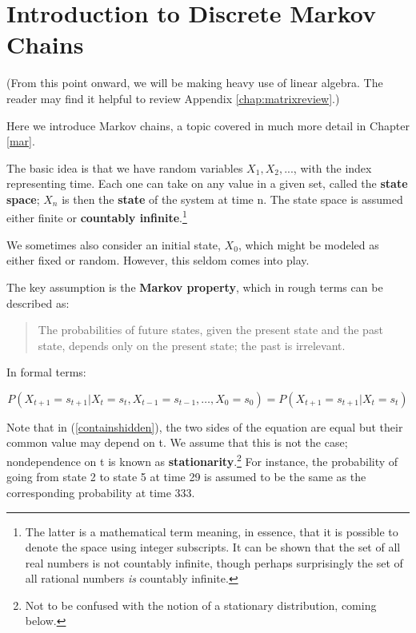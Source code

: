 \chapter{Introduction to Discrete Markov Chains}  
\label{dismarkov}

(From this point onward, we will be making heavy use of linear algebra.
The reader may find it helpful to review Appendix
\ref{chap:matrixreview}.)

Here we introduce Markov chains, a topic covered in much more detail in
Chapter \ref{mar}.  

The basic idea is that we have random variables $X_1, X_2, ...$, with
the index representing time.  Each one can take on any value in a given
set, called the {\bf state space}; $X_n$ is then the {\bf state} of the
system at time n.  The state space is assumed either finite or {\bf countably
infinite}.\footnote{The latter is a mathematical term meaning, in
essence, that it is possible to denote the space using integer
subscripts.  It can be shown that the set of all real numbers is not 
countably infinite, though perhaps surprisingly the set of all rational
numbers {\it is} countably infinite.} 

We sometimes also consider an initial state, $X_0$, which might be
modeled as either fixed or random.  However, this seldom comes into
play.

The key assumption is the {\bf Markov property}, which in rough terms
can be described as:

\begin{quote}
The probabilities of future states, given the present state and the past
state, depends only on the present state; the past is irrelevant.
\end{quote}

In formal terms:

\begin{equation}
\label{containshidden}
P(X_{t+1}=s_{t+1}|X_{t}=s_{t},X_{t-1}=s_{t-1},\ldots ,X_{0}=s_{0})=P(X_{t+1}=s_{t+1}|X_{t}=s_{t})
\end{equation}

Note that in (\ref{containshidden}), the two sides of the equation are
equal but their common value may depend on t.  We assume that this is
not the case; nondependence on t is known as {\bf
stationarity}.\footnote{Not to be confused with the notion of a
stationary distribution, coming below.} For instance, the probability of
going from state 2 to state 5 at time 29 is assumed to be the same as
the corresponding probability at time 333.

